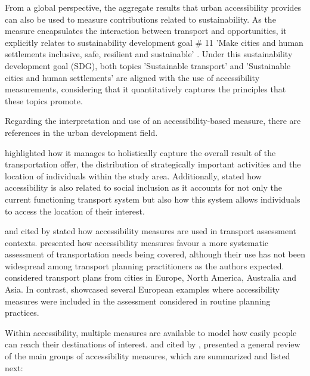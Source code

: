 \documentclass[12pt, a4paper]{report}
\begin{document}

From a global perspective, the aggregate results that urban accessibility provides can also be used to measure contributions related to sustainability. As the measure encapsulates the interaction between transport and opportunities, it explicitly relates to sustainability development goal \# 11 'Make cities and human settlements inclusive, safe, resilient and sustainable' \citep{unitednations17GOALSSustainable2015}. Under this sustainability development goal (SDG), both topics 'Sustainable transport' and 'Sustainable cities and human settlements' are aligned with the use of accessibility measurements, considering that it quantitatively captures the principles that these topics promote.

Regarding the interpretation and use of an accessibility-based measure, there are references in the urban development field.  

\cite{pereiraIntroductionUrbanAccessibility2023a} highlighted how it manages to holistically capture the overall result of the transportation offer, the distribution of strategically important activities and the location of individuals within the study area. Additionally, \cite{pereiraIntroductionUrbanAccessibility2023a} stated how accessibility is also related to social inclusion as it accounts for not only the current functioning transport system but also how this system allows individuals to access the location of their interest.

\cite{papaAccessibilityInstrumentsPlanning2016} and \cite{boisjolyHowGetThere2017} cited by \cite{pereiraIntroductionUrbanAccessibility2023a} stated how accessibility measures are used in transport assessment contexts. \cite{boisjolyHowGetThere2017} presented how accessibility measures favour a more systematic assessment of transportation needs being covered, although their use has not been widespread among transport planning practitioners as the authors expected. \cite{boisjolyHowGetThere2017} considered transport plans from cities in Europe, North America, Australia and Asia.
In contrast, \cite{papaAccessibilityInstrumentsPlanning2016} showcased several European examples where accessibility measures were included in the assessment considered in routine planning practices.


Within accessibility, multiple measures are available to model how easily people can reach their destinations of interest. \cite{paezMeasuringAccessibilityPositive2012} and \cite{dijstOpportunitiesTransportMode2002} cited by \cite{pereiraIntroductionUrbanAccessibility2023a}, presented a general review of the main groups of accessibility measures, which are summarized and listed next:
\end{document}
